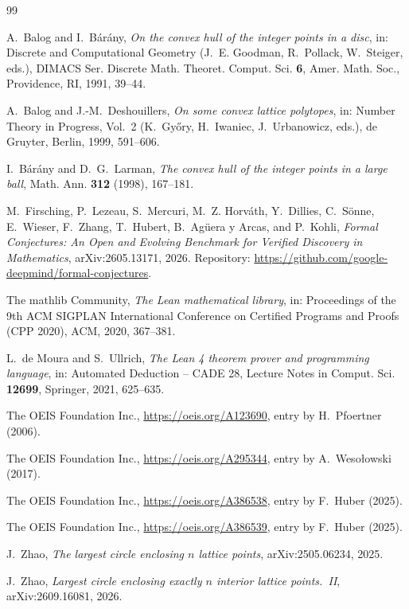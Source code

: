 \documentclass[11pt]{amsart}
\theoremstyle{plain}
\theoremstyle{definition}
\begin{document}
\begin{thebibliography}{99}
\small

A.~Balog and I.~B\'ar\'any, \emph{On the convex hull of the integer points in a disc}, in: Discrete and Computational Geometry (J.~E. Goodman, R.~Pollack, W.~Steiger, eds.), DIMACS Ser. Discrete Math. Theoret. Comput. Sci. \textbf{6}, Amer. Math. Soc., Providence, RI, 1991, 39--44.

A.~Balog and J.-M.~Deshouillers, \emph{On some convex lattice polytopes}, in: Number Theory in Progress, Vol.~2 (K.~Gy\H{o}ry, H.~Iwaniec, J.~Urbanowicz, eds.), de Gruyter, Berlin, 1999, 591--606.

I.~B\'ar\'any and D.~G.~Larman, \emph{The convex hull of the integer points in a large ball}, Math. Ann. \textbf{312} (1998), 167--181.

M.~Firsching, P.~Lezeau, S.~Mercuri, M.~Z. Horv\'ath, Y.~Dillies, C.~S\"onne, E.~Wieser, F.~Zhang, T.~Hubert, B.~Ag\"uera y Arcas, and P.~Kohli, \emph{Formal Conjectures: An Open and Evolving Benchmark for Verified Discovery in Mathematics}, arXiv:2605.13171, 2026. Repository: \url{https://github.com/google-deepmind/formal-conjectures}.

The mathlib Community, \emph{The Lean mathematical library}, in: Proceedings of the 9th ACM SIGPLAN International Conference on Certified Programs and Proofs (CPP 2020), ACM, 2020, 367--381.

L.~de Moura and S.~Ullrich, \emph{The Lean 4 theorem prover and programming language}, in: Automated Deduction -- CADE 28, Lecture Notes in Comput. Sci. \textbf{12699}, Springer, 2021, 625--635.

The OEIS Foundation Inc., \url{https://oeis.org/A123690}, entry by H.~Pfoertner (2006).

The OEIS Foundation Inc., \url{https://oeis.org/A295344}, entry by A.~Weso\l owski (2017).

The OEIS Foundation Inc., \url{https://oeis.org/A386538}, entry by F.~Huber (2025).

The OEIS Foundation Inc., \url{https://oeis.org/A386539}, entry by F.~Huber (2025).

J.~Zhao, \emph{The largest circle enclosing $n$ lattice points}, arXiv:2505.06234, 2025.

J.~Zhao, \emph{Largest circle enclosing exactly $n$ interior lattice points.~II}, arXiv:2609.16081, 2026.

\end{thebibliography}
\end{document}

